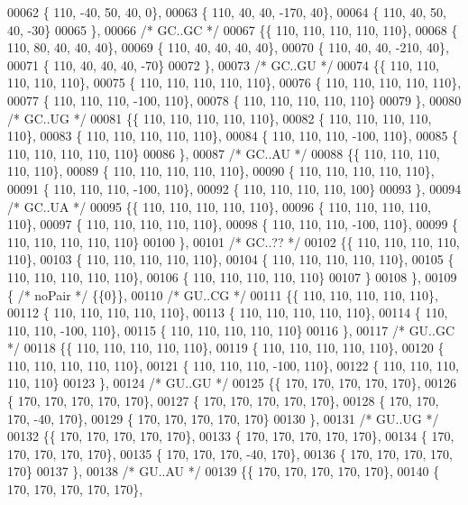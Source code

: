 \begin{DoxyCode}
00062 \{ 110, -40,  50,  40,   0\},
00063 \{ 110,  40,  40, -170,  40\},
00064 \{ 110,  40,  50,  40, -30\}
00065 \},
00066 \textcolor{comment}{/* GC..GC */}
00067 \{\{ 110, 110, 110, 110, 110\},
00068 \{ 110,  80,  40,  40,  40\},
00069 \{ 110,  40,  40,  40,  40\},
00070 \{ 110,  40,  40, -210,  40\},
00071 \{ 110,  40,  40,  40, -70\}
00072 \},
00073 \textcolor{comment}{/* GC..GU */}
00074 \{\{ 110, 110, 110, 110, 110\},
00075 \{ 110, 110, 110, 110, 110\},
00076 \{ 110, 110, 110, 110, 110\},
00077 \{ 110, 110, 110, -100, 110\},
00078 \{ 110, 110, 110, 110, 110\}
00079 \},
00080 \textcolor{comment}{/* GC..UG */}
00081 \{\{ 110, 110, 110, 110, 110\},
00082 \{ 110, 110, 110, 110, 110\},
00083 \{ 110, 110, 110, 110, 110\},
00084 \{ 110, 110, 110, -100, 110\},
00085 \{ 110, 110, 110, 110, 110\}
00086 \},
00087 \textcolor{comment}{/* GC..AU */}
00088 \{\{ 110, 110, 110, 110, 110\},
00089 \{ 110, 110, 110, 110, 110\},
00090 \{ 110, 110, 110, 110, 110\},
00091 \{ 110, 110, 110, -100, 110\},
00092 \{ 110, 110, 110, 110, 100\}
00093 \},
00094 \textcolor{comment}{/* GC..UA */}
00095 \{\{ 110, 110, 110, 110, 110\},
00096 \{ 110, 110, 110, 110, 110\},
00097 \{ 110, 110, 110, 110, 110\},
00098 \{ 110, 110, 110, -100, 110\},
00099 \{ 110, 110, 110, 110, 110\}
00100 \},
00101 \textcolor{comment}{/* GC..?? */}
00102 \{\{ 110, 110, 110, 110, 110\},
00103 \{ 110, 110, 110, 110, 110\},
00104 \{ 110, 110, 110, 110, 110\},
00105 \{ 110, 110, 110, 110, 110\},
00106 \{ 110, 110, 110, 110, 110\}
00107 \}
00108 \},
00109 \{ \textcolor{comment}{/* noPair */} \{\{0\}\},
00110 \textcolor{comment}{/* GU..CG */}
00111 \{\{ 110, 110, 110, 110, 110\},
00112 \{ 110, 110, 110, 110, 110\},
00113 \{ 110, 110, 110, 110, 110\},
00114 \{ 110, 110, 110, -100, 110\},
00115 \{ 110, 110, 110, 110, 110\}
00116 \},
00117 \textcolor{comment}{/* GU..GC */}
00118 \{\{ 110, 110, 110, 110, 110\},
00119 \{ 110, 110, 110, 110, 110\},
00120 \{ 110, 110, 110, 110, 110\},
00121 \{ 110, 110, 110, -100, 110\},
00122 \{ 110, 110, 110, 110, 110\}
00123 \},
00124 \textcolor{comment}{/* GU..GU */}
00125 \{\{ 170, 170, 170, 170, 170\},
00126 \{ 170, 170, 170, 170, 170\},
00127 \{ 170, 170, 170, 170, 170\},
00128 \{ 170, 170, 170, -40, 170\},
00129 \{ 170, 170, 170, 170, 170\}
00130 \},
00131 \textcolor{comment}{/* GU..UG */}
00132 \{\{ 170, 170, 170, 170, 170\},
00133 \{ 170, 170, 170, 170, 170\},
00134 \{ 170, 170, 170, 170, 170\},
00135 \{ 170, 170, 170, -40, 170\},
00136 \{ 170, 170, 170, 170, 170\}
00137 \},
00138 \textcolor{comment}{/* GU..AU */}
00139 \{\{ 170, 170, 170, 170, 170\},
00140 \{ 170, 170, 170, 170, 170\},

\end{DoxyCode}
